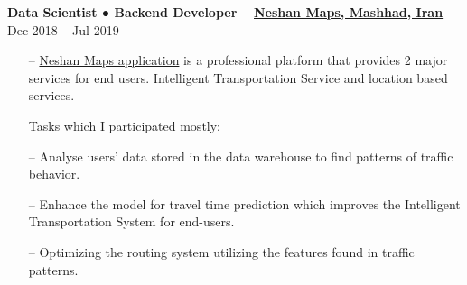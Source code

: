 \documentclass[10pt]{article}
\newenvironment{loneinnerlist}[1][\enskip\textbullet]%
        {\vspace{-\baselineskip}\begin{compactitem}[#1]}
        {\end{compactitem}\vspace{-.6\baselineskip}}
\newcommand{\halfblankline}{\quad\vspace{-0.5\baselineskip}\pagebreak[3]}
\begin{document}
\begin{loneinnerlist}
\begin{itemize}
\end{itemize}


\item \textbf{Data Scientist ● Backend Developer}— \href{https://neshan.org/}{\textbf{Neshan Maps, Mashhad, Iran}} Dec 2018 -- Jul 2019

\begin{itemize}
    \item[--] \href{https://play.google.com/store/apps/details?id=org.rajman.neshan.traffic.tehran.navigator&hl=en_US}{Neshan Maps application} is a professional platform that provides 2 major services for end users. Intelligent Transportation Service and location based services.

    Tasks which I participated mostly:
    \item[--] Analyse users' data stored in the data warehouse to find patterns of traffic behavior.
    \item[--] Enhance the model for travel time prediction which improves the  Intelligent Transportation System for end-users.
    \item[--] Optimizing the routing system utilizing the features found in traffic patterns.


\end{itemize}



\halfblankline


\end{loneinnerlist}
\end{document}
